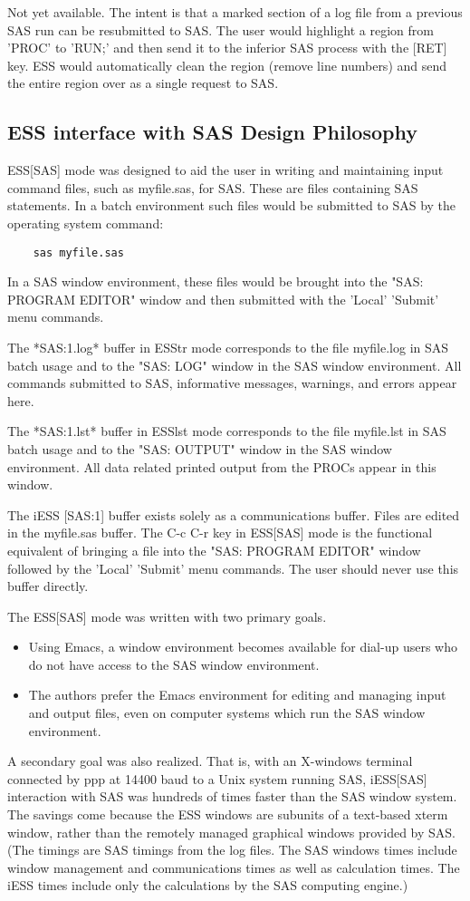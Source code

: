 \documentclass{article}
\begin{document}
Not yet available.  The intent is that a marked section of a log file
from a previous SAS run can be resubmitted to SAS.  The user would
highlight a region from 'PROC' to 'RUN;' and then send it to the
inferior SAS process with the [RET] key.  ESS would automatically
clean the region (remove line numbers) and send the entire region over
as a single request to SAS.


\subsection{ESS interface with SAS Design Philosophy}
\label{sec:SAS:phil}

ESS[SAS] mode was designed to aid the user in writing and maintaining
input command files, such as myfile.sas, for SAS.  These are files
containing SAS statements.  In a batch environment such files would be
submitted to SAS by the operating system command:
\begin{verbatim}
    sas myfile.sas
\end{verbatim}
In a SAS window environment, these files would be brought into the
"SAS: PROGRAM EDITOR" window and then submitted with the 'Local' 'Submit'
menu commands.

The *SAS:1.log* buffer in ESStr mode corresponds to the file
myfile.log in SAS batch usage and to the "SAS: LOG" window in the SAS
window environment.  All commands submitted to SAS, informative
messages, warnings, and errors appear here.

The *SAS:1.lst* buffer in ESSlst mode corresponds to the file
myfile.lst in SAS batch usage and to the "SAS: OUTPUT" window in the
SAS window environment.  All data related printed output from the
PROCs appear in this window.

The iESS [SAS:1] buffer exists solely as a communications buffer.
Files are edited in the myfile.sas buffer.  The C-c C-r key in
ESS[SAS] mode is the functional equivalent of bringing a file into the
"SAS: PROGRAM EDITOR" window followed by the 'Local' 'Submit' menu
commands.  The user should never use this buffer directly.

The ESS[SAS] mode was written with two primary goals.
\begin{itemize}
\item Using Emacs, a window environment becomes available for dial-up
  users who do not have access to the SAS window environment.
\item The authors prefer the Emacs environment for editing and
  managing input and output files, even on computer systems which run
  the SAS window environment.
\end{itemize}
A secondary goal was also realized.  That is, with an X-windows
terminal connected by ppp at 14400 baud to a Unix system running SAS,
iESS[SAS] interaction with SAS was hundreds of times faster than the
SAS window system.  The savings come because the ESS windows are
subunits of a text-based xterm window, rather than the remotely
managed graphical windows provided by SAS.  (The timings are SAS
timings from the log files.  The SAS windows times include window
management and communications times as well as calculation times.  The
iESS times include only the calculations by the SAS computing engine.)
\end{document}
